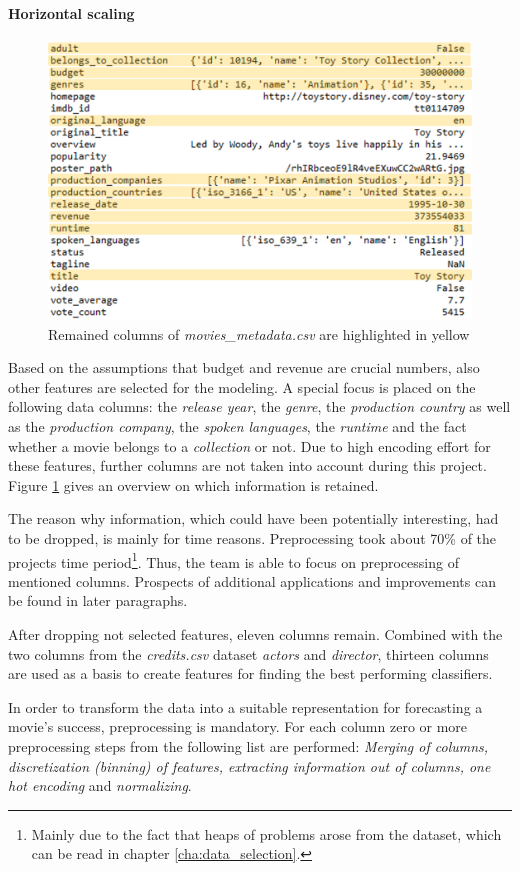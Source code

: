\paragraph{Horizontal scaling}
\begin{figure}
	\includegraphics[width=0.6 \textwidth]{images/3_metadata_columns.png}
	\caption{Remained columns of \textit{movies\_metadata.csv} are highlighted in yellow}
	\label{img:mm_columns}
\end{figure}

Based on the assumptions that budget and revenue are crucial numbers, also other features are selected for the modeling. A special focus is placed on the following data columns: the \textit{release year}, the \textit{genre}, the \textit{production country} as well as the \textit{production company}, the \textit{spoken languages}, the \textit{runtime} and the fact whether a movie belongs to a \textit{collection} or not. Due to high encoding effort for these features, further columns are not taken into account during this project. Figure \ref{img:mm_columns} gives an overview on which information is retained.

The reason why information, which could have been potentially interesting, had to be dropped, is mainly for time reasons. Preprocessing took about 70\% of the projects time period\footnote{Mainly due to the fact that heaps of problems arose from the dataset, which can be read in chapter \ref{cha:data_selection}.}. Thus, the team is able to focus on preprocessing of mentioned columns. Prospects of additional applications and improvements can be found in later paragraphs.

After dropping not selected features, eleven columns remain. Combined with the two columns from the \textit{credits.csv} dataset \textit{actors} and \textit{director}, thirteen columns are used as a basis to create features for finding the best performing classifiers.

In order to transform the data into a suitable representation for forecasting a movie's success, preprocessing is mandatory. For each column zero or more preprocessing steps from the following list are performed: \textit{Merging of columns, discretization (binning) of features, extracting information out of columns, one hot encoding} and \textit{normalizing}.

